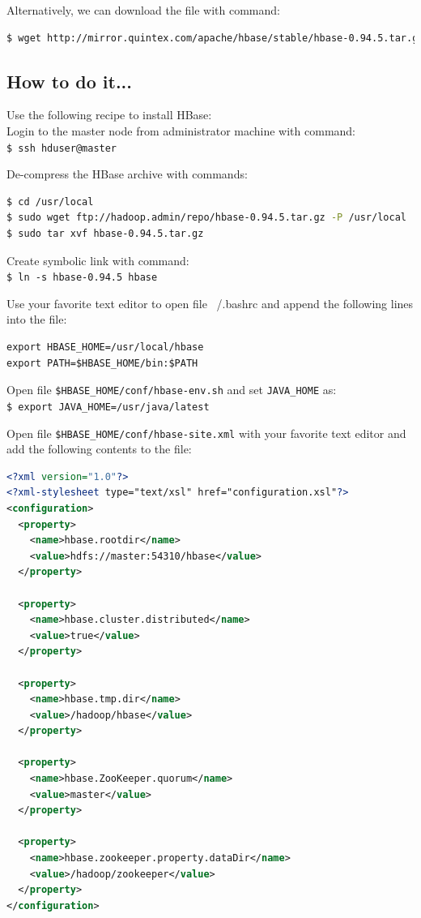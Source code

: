 Alternatively, we can download the file with command:
\lstset{style=bashstyle}
\begin{lstlisting}[language=bash]
$ wget http://mirror.quintex.com/apache/hbase/stable/hbase-0.94.5.tar.gz -P ~/repo
\end{lstlisting}

\subsection*{How to do it...}
Use the following recipe to install HBase: \\
Login to the master node from administrator machine with command: \\
\verb|$ ssh hduser@master|

De-compress the HBase archive with commands:
\lstset{style=bashstyle}
\begin{lstlisting}[language=bash]
$ cd /usr/local
$ sudo wget ftp://hadoop.admin/repo/hbase-0.94.5.tar.gz -P /usr/local
$ sudo tar xvf hbase-0.94.5.tar.gz
\end{lstlisting}

Create symbolic link with command: \\
\verb|$ ln -s hbase-0.94.5 hbase|

Use your favorite text editor to open file ~/.bashrc and append the following lines into the file:
\begin{verbatim}
export HBASE_HOME=/usr/local/hbase
export PATH=$HBASE_HOME/bin:$PATH
\end{verbatim}

Open file \verb|$HBASE_HOME/conf/hbase-env.sh| and set \verb|JAVA_HOME| as: \\
\verb|$ export JAVA_HOME=/usr/java/latest|

Open file \verb|$HBASE_HOME/conf/hbase-site.xml| with your favorite text editor and add the following contents to the file:
\lstset{style=bashstyle}
\begin{lstlisting}[language=XML]
<?xml version="1.0"?>
<?xml-stylesheet type="text/xsl" href="configuration.xsl"?>
<configuration>
  <property>
    <name>hbase.rootdir</name>
    <value>hdfs://master:54310/hbase</value>
  </property>

  <property>
    <name>hbase.cluster.distributed</name>
    <value>true</value>
  </property>

  <property>
    <name>hbase.tmp.dir</name>
    <value>/hadoop/hbase</value>
  </property>

  <property>
    <name>hbase.ZooKeeper.quorum</name>
    <value>master</value>
  </property>

  <property>
    <name>hbase.zookeeper.property.dataDir</name>
    <value>/hadoop/zookeeper</value>
  </property>
</configuration>
\end{lstlisting}

